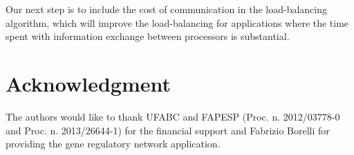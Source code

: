 \documentclass[journal]{IEEEtran}
\begin{document}
Our next step is to include the cost of communication in the load-balancing
algorithm, which will improve the load-balancing for applications where the time
spent with information exchange between processors is substantial.

\section*{Acknowledgment}

The authors would like to thank UFABC and FAPESP (Proc. n. 2012/03778-0 and
Proc. n.  2013/26644-1) for the financial support and Fabrizio Borelli for
providing the gene regulatory network application.

\ifCLASSOPTIONcaptionsoff
  \newpage
\fi



%
%

\end{document}
